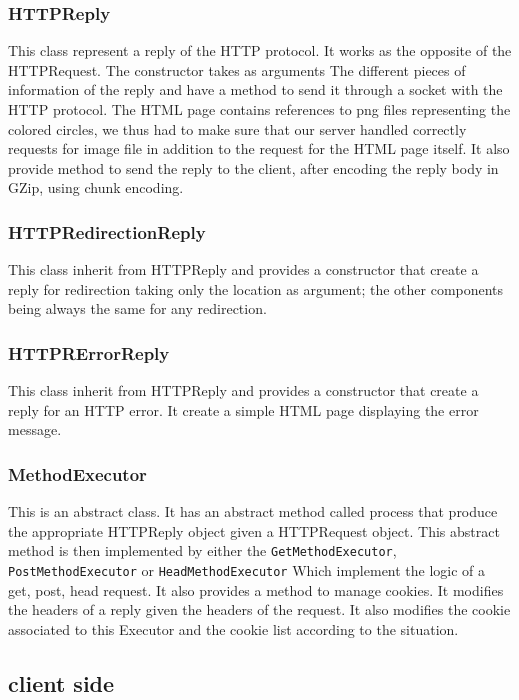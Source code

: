 \documentclass[11pt]{article}
\begin{document}
\subsubsection{HTTPReply}
This class represent a reply of the HTTP protocol. It works as the opposite of the HTTPRequest. The constructor takes as arguments The different pieces of information of the reply and have a method to send it through a socket with the HTTP protocol. The HTML page contains references to png files representing the colored circles, we thus had to make sure that our server handled correctly requests for image file in addition to the request for the HTML page itself. It also provide method to send the reply to the client, after encoding the reply body in GZip, using chunk encoding.

\subsubsection{HTTPRedirectionReply}
This class inherit from HTTPReply and provides a constructor that create a reply for redirection taking only the location as argument; the other components being always the same for any redirection.

\subsubsection{HTTPRErrorReply}
This class inherit from HTTPReply and provides a constructor that create a reply for an HTTP error. It create a simple HTML page displaying the error message.

\subsubsection{MethodExecutor}
This is an abstract class. It has an abstract method called process that produce the appropriate HTTPReply object given a HTTPRequest object. This abstract method is then implemented by either the \texttt{GetMethodExecutor}, \texttt{PostMethodExecutor} or \texttt{HeadMethodExecutor} Which implement the logic of a get, post, head request. It also provides a method to manage cookies. It modifies the headers of a reply given the headers of the request. It also modifies the cookie associated to this Executor and the cookie list according to the situation.

\subsection{client side}
\end{document}
